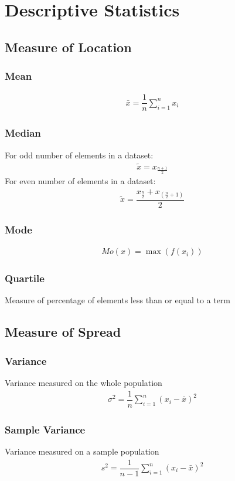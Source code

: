 \chapter{Descriptive Statistics}
\section{Measure of Location}
\subsection{Mean}
\begin{align}
	\bar{x} = \dfrac{1}{n} \displaystyle\sum_{i=1}^{n} x_i
\end{align}
\subsection{Median}
For odd number of elements in a dataset:
\begin{align}
	\tilde{x} = x_{\frac{n+1}{2}}
\end{align}
For even number of elements in a dataset:
\begin{align}
	\tilde{x} = \dfrac{x_{\frac{n}{2}}+x_{\left(\frac{n}{2}+1\right)}}{2}
\end{align}
\subsection{Mode}
\begin{align}
	Mo(x) = \max(f(x_i))
\end{align}

\subsection{Quartile}
Measure of percentage of elements less than or equal to a term

\section{Measure of Spread}
\subsection{Variance}
Variance measured on the whole population
\begin{align}
	\sigma^2 = \dfrac{1}{n} \sum_{i=1}^{n} \left( x_i - \bar{x} \right)^2
\end{align}
\subsection{Sample Variance}
Variance measured on a sample population
\begin{align}
	s^2 = \dfrac{1}{n-1} \sum_{i=1}^{n} \left( x_i - \bar{x} \right)^2
\end{align}

